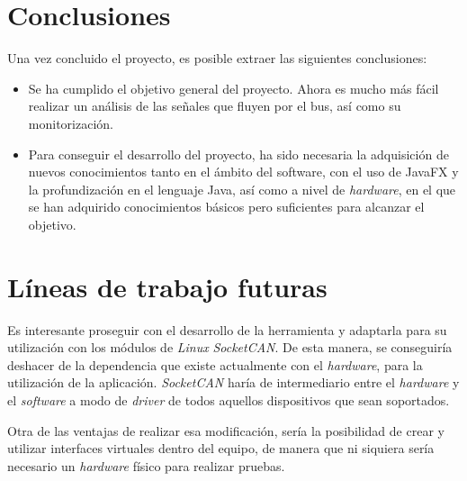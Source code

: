 
\section{Conclusiones}\label{conclusiones}

Una vez concluido el proyecto, es posible extraer las siguientes conclusiones:
\begin{itemize}
\item
Se ha cumplido el objetivo general del proyecto. Ahora es mucho más fácil realizar un análisis de las señales que fluyen por el bus, así como su monitorización.

\item
Para conseguir el desarrollo del proyecto, ha sido necesaria la adquisición de nuevos conocimientos tanto en el ámbito del software, con el uso de JavaFX y la profundización en el lenguaje Java, así como a nivel de \emph{hardware}, en el que se han adquirido conocimientos básicos pero suficientes para alcanzar el objetivo.

\end{itemize}


\section{Líneas de trabajo futuras}\label{lineas_de_trabajo_futuras}

Es interesante proseguir con el desarrollo de la herramienta y adaptarla para su utilización con los módulos de \emph{Linux} \emph{SocketCAN}.
De esta manera, se conseguiría deshacer de la dependencia que existe actualmente con el \emph{hardware}, para la utilización de la aplicación. \emph{SocketCAN} haría de intermediario entre el \emph{hardware} y el \emph{software} a modo de \emph{driver} de todos aquellos dispositivos que sean soportados.

Otra de las ventajas de realizar esa modificación, sería la posibilidad de crear y utilizar interfaces virtuales dentro del equipo, de manera que ni siquiera sería necesario un \emph{hardware} físico para realizar pruebas.

